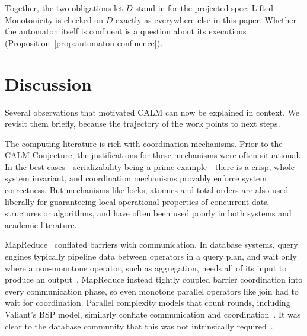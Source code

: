\documentclass[sigconf]{cidr-2027}
\theoremstyle{remark}
\begin{document}
Together, the two obligations let $D$ stand in for the projected spec:
Lifted Monotonicity is checked on $D$ exactly as everywhere else in this paper. Whether the automaton itself is confluent is a question about its executions
(Proposition~\ref{prop:automaton-confluence}).

\section{Discussion}
\label{sec:discussion}

Several observations that motivated CALM can now be explained
in context. We revisit them briefly, because the
trajectory of the work points to next steps.

\textcolor{reviewed}{The computing literature is rich with coordination mechanisms.} \textcolor{reviewed}{Prior to the CALM
Conjecture, the justifications for these mechanisms were often situational.} \textcolor{reviewed}{In
the best cases---serializability being a prime example---there is a crisp,
whole-system invariant, and coordination mechanisms provably enforce system
correctness.} \textcolor{reviewed}{But mechanisms like locks, atomics and total orders are also used
liberally for guaranteeing local operational properties of concurrent data
structures or algorithms, and have often been used poorly in both systems and
academic literature.}

\textcolor{reviewed}{MapReduce~\cite{dean2004mapreduce} conflated barriers with communication.} \textcolor{reviewed}{In database systems, query
engines typically pipeline data between operators in a query plan, and wait only
where a non-monotone operator, such as aggregation, needs all of its input to
produce an output~\cite{wilschut1991dataflow,graefe1990volcano}.} \textcolor{reviewed}{MapReduce
instead tightly coupled barrier coordination into every communication phase,
so even monotone parallel operators like join had to wait for coordination.} \textcolor{reviewed}{Parallel complexity models that count rounds, including Valiant's BSP model,
similarly conflate communication and
coordination~\cite{valiant1990bsp,karloff2010mrc}.} It was clear to the database
community that this was not intrinsically
required~\cite{dewitt2008mapreduce,condie2010online}.
\end{document}
